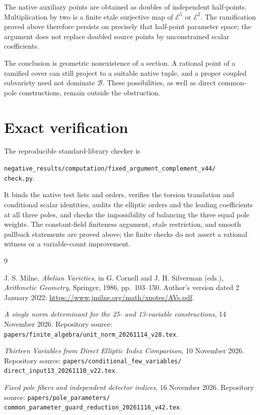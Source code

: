 \documentclass[11pt,a4paper]{article}
\theoremstyle{remark}\newtheorem{remark}[theorem]{Remark}
\begin{document}
The native auxiliary points are obtained as doubles of independent
half-points. Multiplication by two is a finite etale surjective map
of $\mathcal E^5$ or $\mathcal E^2$. The ramification proved above
therefore persists on precisely that half-point parameter space;
the argument does not replace doubled source points by unconstrained
scalar coefficients.

The conclusion is geometric nonexistence of a section. A rational
point of a ramified cover can still project to a suitable native
tuple, and a proper coupled subvariety need not dominate
$\mathcal B$. These possibilities, as well as direct common-pole
constructions, remain outside the obstruction.

\section{Exact verification}

The reproducible standard-library checker is
\begin{center}\small
\texttt{negative\_results/computation/fixed\_argument\_complement\_v44/}\\
\texttt{check.py}.
\end{center}
It binds the native test lists and orders, verifies the torsion
translation and conditional scalar identities, audits the elliptic
orders and the leading coefficients at all three poles, and checks
the impossibility of balancing the three equal pole weights.
The constant-field finiteness argument, etale restriction, and
smooth pullback statements are proved above; the finite checks
do not assert a rational witness or a variable-count improvement.

\begin{thebibliography}{9}
\raggedright
{}
J. S. Milne, \emph{Abelian Varieties}, in
G. Cornell and J. H. Silverman (eds.), \emph{Arithmetic Geometry},
Springer, 1986, pp.~103--150.
Author's version dated 2 January 2022:
\url{https://www.jmilne.org/math/xnotes/AVs.pdf}.

\emph{A single norm determinant for the 25- and 13-variable constructions},
14 November 2026. Repository source:
\texttt{papers/finite\_algebra/unit\_norm\_20261114\_v28.tex}.

\emph{Thirteen Variables from Direct Elliptic Index Comparison},
10 November 2026. Repository source:
\texttt{papers/conditional\_few\_variables/}\\
\texttt{direct\_input13\_20261110\_v22.tex}.

\emph{Fixed pole fibers and independent detector indices},
16 November 2026. Repository source:
\texttt{papers/pole\_parameters/}\\
\texttt{common\_parameter\_guard\_reduction\_20261116\_v42.tex}.
\end{thebibliography}
\end{document}
